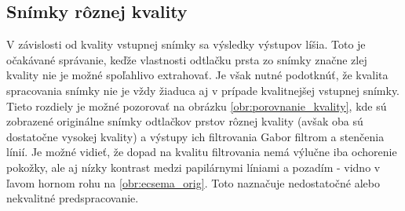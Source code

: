   \subsection{Snímky rôznej kvality}
  V závislosti od kvality vstupnej snímky sa výsledky výstupov líšia. Toto je očakávané správanie, keďže vlastnosti odtlačku prsta zo snímky značne zlej
  kvality nie je možné spoľahlivo extrahovať. Je však nutné podotknúť, že kvalita spracovania snímky nie je vždy žiaduca aj v prípade kvalitnejšej vstupnej
  snímky. Tieto rozdiely je možné pozorovať na obrázku \ref{obr:porovnanie_kvality}, kde sú zobrazené originálne snímky odtlačkov prstov rôznej kvality
  (avšak oba sú dostatočne vysokej kvality) a výstupy ich filtrovania Gabor filtrom a stenčenia línií. Je možné vidieť, že dopad na kvalitu filtrovania
  nemá výlučne iba ochorenie pokožky, ale aj nízky kontrast medzi papilárnymi líniami a pozadím - vidno v ľavom hornom rohu na \ref{obr:ecsema_orig}.
  Toto naznačuje nedostatočné alebo nekvalitné predspracovanie.

